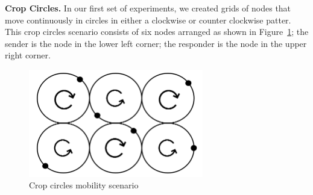 
{\bf Crop Circles.} In our first set of experiments, we created grids
of nodes that move continuously in circles in either a clockwise or
counter clockwise patter. This crop circles scenario consists of six
nodes arranged as shown in Figure~\ref{fig:cropcircle1}; the sender is
the node in the lower left corner; the responder is the node in the
upper right corner.
\begin{figure}
\vspace{-.2cm}
\begin{center}
\includegraphics[width=3in]{figures/cropcircle1.png}
\end{center}
\vspace{-.75cm}
\caption{Crop circles mobility scenario}\label{fig:cropcircle1}
\vspace{-.25cm}
\end{figure}

